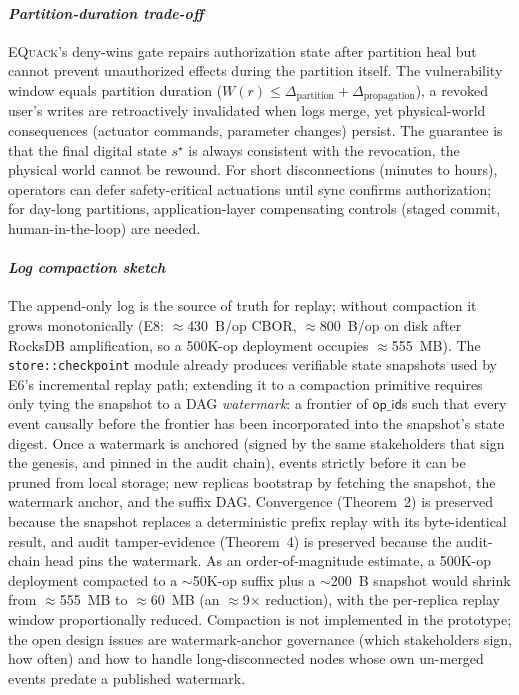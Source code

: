 \documentclass[10pt,journal,compsoc]{IEEEtran}
\newcommand{\equack}{\textsc{EQuack}}
\begin{document}
\paragraph*{\textit{Partition-duration trade-off}}
\equack{}'s deny-wins gate repairs authorization state after partition heal but cannot prevent unauthorized effects during the partition itself. The vulnerability window equals partition duration ($W(r) \leq \Delta_{\text{partition}} + \Delta_{\text{propagation}}$), a revoked user's writes are retroactively invalidated when logs merge, yet physical-world consequences (actuator commands, parameter changes) persist. The guarantee is that the final digital state $s^\star$ is always consistent with the revocation, the physical world cannot be rewound. For short disconnections (minutes to hours), operators can defer safety-critical actuations until sync confirms authorization; for day-long partitions, application-layer compensating controls (staged commit, human-in-the-loop) are needed.

\paragraph*{\textit{Log compaction sketch}}
The append-only log is the source of truth for replay; without compaction it grows monotonically (E8: $\approx$430~B/op CBOR, $\approx$800~B/op on disk after RocksDB amplification, so a 500K-op deployment occupies $\approx$555~MB). The \texttt{store::checkpoint} module already produces verifiable state snapshots used by E6's incremental replay path; extending it to a compaction primitive requires only tying the snapshot to a DAG \emph{watermark}: a frontier of $\textsf{op\_id}$s such that every event causally before the frontier has been incorporated into the snapshot's state digest. Once a watermark is anchored (signed by the same stakeholders that sign the genesis, and pinned in the audit chain), events strictly before it can be pruned from local storage; new replicas bootstrap by fetching the snapshot, the watermark anchor, and the suffix DAG. Convergence (Theorem~2) is preserved because the snapshot replaces a deterministic prefix replay with its byte-identical result, and audit tamper-evidence (Theorem~4) is preserved because the audit-chain head pins the watermark. As an order-of-magnitude estimate, a 500K-op deployment compacted to a $\sim$50K-op suffix plus a $\sim$200~B snapshot would shrink from $\approx$555~MB to $\approx$60~MB (an $\approx$9$\times$ reduction), with the per-replica replay window proportionally reduced. Compaction is not implemented in the prototype; the open design issues are watermark-anchor governance (which stakeholders sign, how often) and how to handle long-disconnected nodes whose own un-merged events predate a published watermark.
\end{document}
